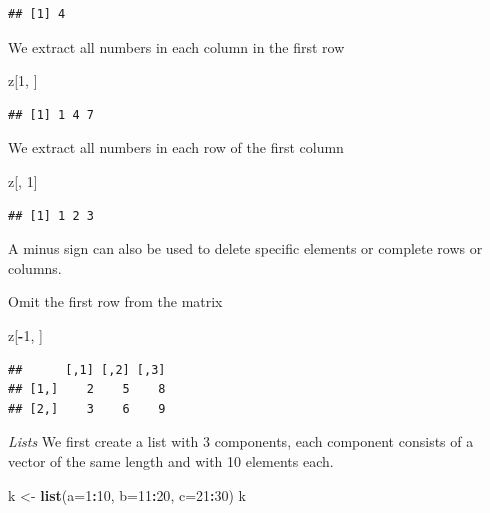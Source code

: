 \documentclass[]{book}
\newenvironment{Shaded}{\begin{snugshade}}{\end{snugshade}}
\newcommand{\KeywordTok}[1]{\textcolor[rgb]{0.13,0.29,0.53}{\textbf{#1}}}
\newcommand{\DataTypeTok}[1]{\textcolor[rgb]{0.13,0.29,0.53}{#1}}
\newcommand{\DecValTok}[1]{\textcolor[rgb]{0.00,0.00,0.81}{#1}}
\newcommand{\StringTok}[1]{\textcolor[rgb]{0.31,0.60,0.02}{#1}}
\newcommand{\OperatorTok}[1]{\textcolor[rgb]{0.81,0.36,0.00}{\textbf{#1}}}
\newcommand{\NormalTok}[1]{#1}
\begin{document}
\begin{verbatim}
## [1] 4
\end{verbatim}

We extract all numbers in each column in the first row

\begin{Shaded}
\begin{Highlighting}[]
\NormalTok{z[}\DecValTok{1}\NormalTok{, ]}
\end{Highlighting}
\end{Shaded}

\begin{verbatim}
## [1] 1 4 7
\end{verbatim}

We extract all numbers in each row of the first column

\begin{Shaded}
\begin{Highlighting}[]
\NormalTok{z[, }\DecValTok{1}\NormalTok{]}
\end{Highlighting}
\end{Shaded}

\begin{verbatim}
## [1] 1 2 3
\end{verbatim}

A minus sign can also be used to delete specific elements or complete
rows or columns.

Omit the first row from the matrix

\begin{Shaded}
\begin{Highlighting}[]
\NormalTok{z[}\OperatorTok{-}\DecValTok{1}\NormalTok{, ]}
\end{Highlighting}
\end{Shaded}

\begin{verbatim}
##      [,1] [,2] [,3]
## [1,]    2    5    8
## [2,]    3    6    9
\end{verbatim}

\emph{Lists} We first create a list with 3 components, each component
consists of a vector of the same length and with 10 elements each.

\begin{Shaded}
\begin{Highlighting}[]
\NormalTok{k <-}\StringTok{ }\KeywordTok{list}\NormalTok{(}\DataTypeTok{a=}\DecValTok{1}\OperatorTok{:}\DecValTok{10}\NormalTok{, }\DataTypeTok{b=}\DecValTok{11}\OperatorTok{:}\DecValTok{20}\NormalTok{, }\DataTypeTok{c=}\DecValTok{21}\OperatorTok{:}\DecValTok{30}\NormalTok{)}
\NormalTok{k}
\end{Highlighting}
\end{Shaded}
\end{document}
